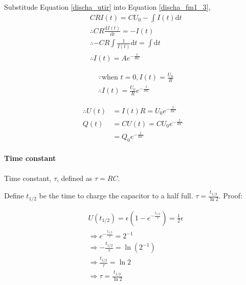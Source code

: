             Substitude Equation \ref{discha_utir} into Equation \ref{discha_fm1_3}, 
            \begin{align}
                & C R I(t) = C U_0 - \int  I(t) \mathrm{d} t \\
                & \therefore C R \frac{\mathrm{d} I(t)}{\mathrm{d} t} = - I(t) \\
                & \therefore - C R \int \frac{1}{I(t)} \mathrm{d} t = \int \mathrm{d} t \\
                & \therefore I(t) = A e^{- \frac{t}{RC}}
            \end{align}

            \begin{align}
                & \because \mbox{when\ } t = 0, I(t) = \frac{U_0}{R} \\
                & \therefore I(t) = \frac{U_0}{R} e^{- \frac{t}{RC}}
            \end{align}

            \begin{align}
                \therefore  U(t) &= I(t) R = U_0 e^{- \frac{t}{RC}} \\
                            Q(t) &= C U(t) = C U_0 e^{- \frac{t}{RC}} \\
                                 &= Q_0 e^{- \frac{t}{RC}}
            \end{align}

        \paragraph{Time constant}
            Time constant, $\tau$, defined as $\tau = RC$. 

            Define $t_{1/2}$ be the time to charge the capacitor to a half full. $\tau = \frac{t_{1/2}}{\ln 2}$. Proof:

            \begin{align}
                & U(t_{1/2}) = \epsilon (1 - e^{- \frac{t_{1/2}}{\tau}}) = \frac{1}{2} \epsilon \\
                & \Rightarrow e^{- \frac{t_{1/2}}{\tau}} = 2^{-1} \\
                & \Rightarrow -\frac{t_{1/2}}{\tau} = \ln (2^{-1}) \\
                & \Rightarrow \frac{t_{1/2}}{\tau} = \ln 2 \\
                & \Rightarrow \tau = \frac{t_{1/2}}{\ln 2}
            \end{align}


